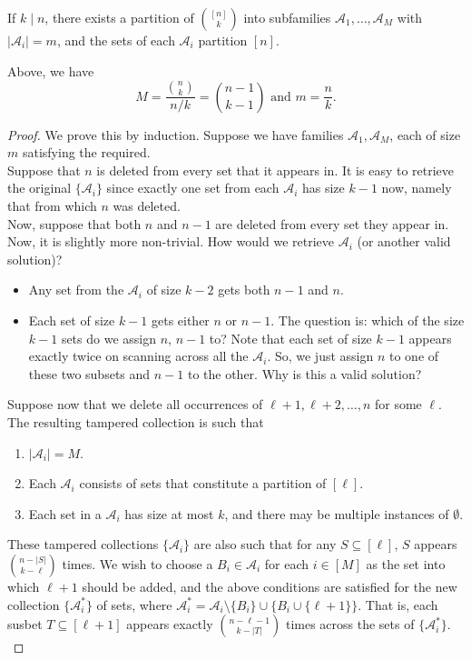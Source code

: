 			\begin{ftheo}
				If $k\mid n$, there exists a partition of $\binom{[n]}{k}$ into subfamilies $\mathcal{A}_1, \ldots, \mathcal{A}_M$ with $|\mathcal{A}_i| = m$, and the sets of each $\mathcal{A}_i$ partition $[n]$.
			\end{ftheo}
			Above, we have
			\[ M = \frac{\binom{n}{k}}{n/k} = \binom{n-1}{k-1} \text{ and } m = \frac{n}{k}. \]
			\begin{proof}
				We prove this by induction. Suppose we have families $\mathcal{A}_1,\mathcal{A}_M$, each of size $m$ satisfying the required.\\
				Suppose that $n$ is deleted from every set that it appears in. It is easy to retrieve the original $\{\mathcal{A}_i\}$ since exactly one set from each $\mathcal{A}_i$ has size $k-1$ now, namely that from which $n$ was deleted.\\
				Now, suppose that both $n$ and $n-1$ are deleted from every set they appear in. Now, it is slightly more non-trivial. How would we retrieve $\mathcal{A}_i$ (or another valid solution)? 
				\begin{itemize}
					\item Any set from the $\mathcal{A}_i$ of size $k-2$ gets both $n-1$ and $n$.
					\item Each set of size $k-1$ gets either $n$ or $n-1$. The question is: which of the size $k-1$ sets do we assign $n$, $n-1$ to? Note that each set of size $k-1$ appears exactly twice on scanning across all the $\mathcal{A}_i$. So, we just assign $n$ to one of these two subsets and $n-1$ to the other. Why is this a valid solution?
				\end{itemize}
				Suppose now that we delete all occurrences of $\ell+1,\ell+2,\ldots,n$ for some $\ell$. The resulting tampered collection is such that
				\begin{enumerate}
					\item $|\mathcal{A}_i| = M$.
					\item Each $\mathcal{A}_i$ consists of sets that constitute a partition of $[\ell]$.
					\item Each set in a $\mathcal{A}_i$ has size at most $k$, and there may be multiple instances of $\emptyset$.
				\end{enumerate}
				These tampered collections $\{\mathcal{A}_i\}$ are also such that for any $S \subseteq [\ell]$, $S$ appears $\binom{n-|S|}{k-\ell}$ times. We wish to choose a $B_i \in \mathcal{A}_i$ for each $i \in [M]$ as the set into which $\ell+1$ should be added, and the above conditions are satisfied for the new collection $\{\mathcal{A}_i^*\}$ of sets, where $\mathcal{A}_i^* = \mathcal{A}_i \setminus \{B_i\} \cup \{B_i \cup \{\ell+1\}\}$. That is, each susbet $T \subseteq [\ell+1]$ appears exactly $\binom{n-\ell-1}{k-|T|}$ times across the sets of $\{\mathcal{A}_i^*\}$. \\

\end{proof}
